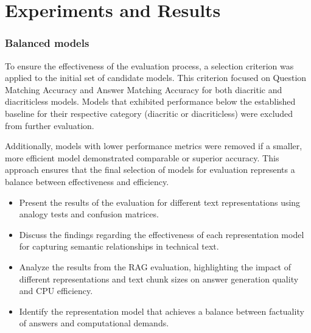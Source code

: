 
\chapter{Experiments and Results\label{chap:experiments_and_results}}



\subsection{Balanced models}
To ensure the effectiveness of the evaluation process, a selection criterion was applied to the initial set of candidate models.
This criterion focused on Question Matching Accuracy and Answer Matching Accuracy for both diacritic and diacriticless models.
Models that exhibited performance below the established baseline for their respective category (diacritic or diacriticless) were excluded from further evaluation.

Additionally, models with lower performance metrics were removed if a smaller, more efficient model demonstrated comparable or superior accuracy.
This approach ensures that the final selection of models for evaluation represents a balance between effectiveness and efficiency.



\begin{itemize}
    \item Present the results of the evaluation for different text representations using analogy tests and confusion matrices.
    \item Discuss the findings regarding the effectiveness of each representation model for capturing semantic relationships in technical text.
    \item Analyze the results from the RAG evaluation, highlighting the impact of different representations and text chunk sizes on answer generation quality and CPU efficiency.
    \item Identify the representation model that achieves a balance between factuality of answers and computational demands.
\end{itemize}